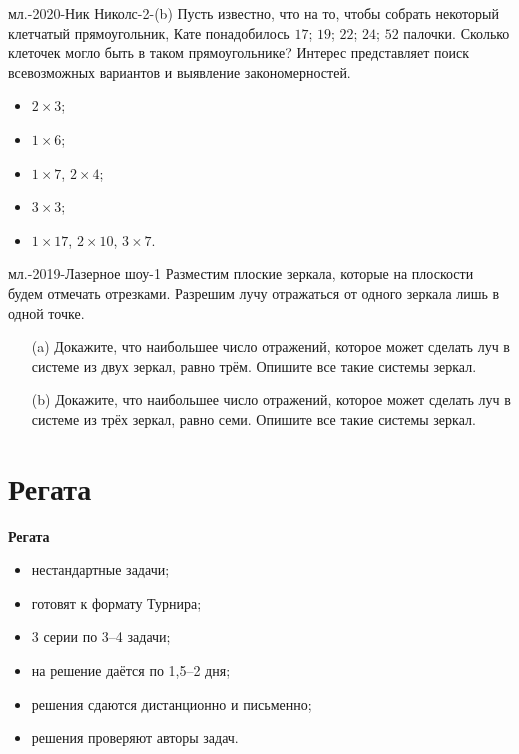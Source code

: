 \documentclass[11pt]{beamer}
\newcommand\fram[2]{\begin{frame}{\bf #1} #2 \end{frame}}
\def\usl#1#2{\begin{block}{#1} #2 \end{block} \medskip\pause}
\def\uslnp#1#2{\begin{block}{#1} #2 \end{block} \medskip}
\begin{document}
\fram{}{
\usl{мл.-2020-Ник Николс-2-(b)}{
Пусть известно, что на то, чтобы собрать некоторый клетчатый прямоугольник, Кате понадобилось $17$; $19$; $22$; $24$; $52$ палочки. Сколько клеточек могло быть в таком прямоугольнике? Интерес представляет поиск всевозможных вариантов и выявление закономерностей.
}

\begin{itemize}
	\item $2 \times 3$;
	\item $1 \times 6$;
	\item $1 \times 7$, $2 \times 4$;
	\item $3 \times 3$;
	\item $1 \times 17$, $2 \times 10$, $3 \times 7$.
\end{itemize}
}

\fram{}{
\uslnp{мл.-2019-Лазерное шоу-1}{
Разместим плоские зеркала, которые на плоскости будем отмечать отрезками. Разрешим лучу отражаться от одного зеркала лишь в одной точке.
\begin{enumerate}
\item[(a)] Докажите, что наибольшее число отражений, которое может сделать луч в системе из
двух зеркал, равно трём. Опишите все такие системы зеркал.
\item[(b)] Докажите, что наибольшее число отражений, которое может сделать луч в системе из
трёх зеркал, равно семи. Опишите все такие системы зеркал.
\end{enumerate}
}
}

\section{Регата}
\fram{Регата}{
\Large

\begin{itemize}
	\item нестандартные задачи;
	\item готовят к формату Турнира;
	\item 3 серии по 3--4 задачи;
	\item на решение даётся по 1,5--2 дня;
	\item решения сдаются дистанционно и письменно;
	\item решения проверяют авторы задач.
\end{itemize}
}
\end{document}
